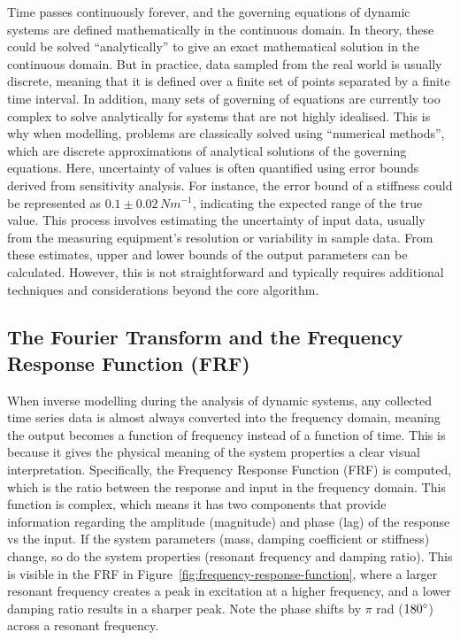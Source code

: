 \documentclass[12pt]{article}
\begin{document}
    Time passes continuously forever, and the governing equations of dynamic systems are defined mathematically in the continuous domain.
    In theory, these could be solved ``analytically'' to give an exact mathematical solution in the continuous domain.
    But in practice, data sampled from the real world is usually discrete, meaning that it is defined over a finite set of points separated by a finite time interval.
    In addition, many sets of governing of equations are currently too complex to solve analytically for systems that are not highly idealised.
    This is why when modelling, problems are classically solved using ``numerical methods'', which are discrete approximations of analytical solutions of the governing equations.
    Here, uncertainty of values is often quantified using error bounds derived from sensitivity analysis.
    For instance, the error bound of a stiffness could be represented as $0.1 \pm 0.02 \, Nm^{-1}$, indicating the expected range of the true value.
    This process involves estimating the uncertainty of input data, usually from the measuring equipment's resolution or variability in sample data.
    From these estimates, upper and lower bounds of the output parameters can be calculated.
    However, this is not straightforward and typically requires additional techniques and considerations beyond the core algorithm.


    \subsection{The Fourier Transform and the Frequency Response Function (FRF)}

    When inverse modelling during the analysis of dynamic systems, any collected time series data is almost always converted into the frequency domain, meaning the output becomes a function of frequency instead of a function of time.
    This is because it gives the physical meaning of the system properties a clear visual interpretation.
    Specifically, the Frequency Response Function (FRF) is computed, which is the ratio between the response and input in the frequency domain.
    This function is complex, which means it has two components that provide information regarding the amplitude (magnitude) and phase (lag) of the response vs the input.
    If the system parameters (mass, damping coefficient or stiffness) change, so do the system properties (resonant frequency and damping ratio).
    This is visible in the FRF in Figure~\ref{fig:frequency-response-function}, where a larger resonant frequency creates a peak in excitation at a higher frequency, and a lower damping ratio results in a sharper peak.
    Note the phase shifts by $\pi$ rad ($180\degree$) across a resonant frequency.
\end{document}
